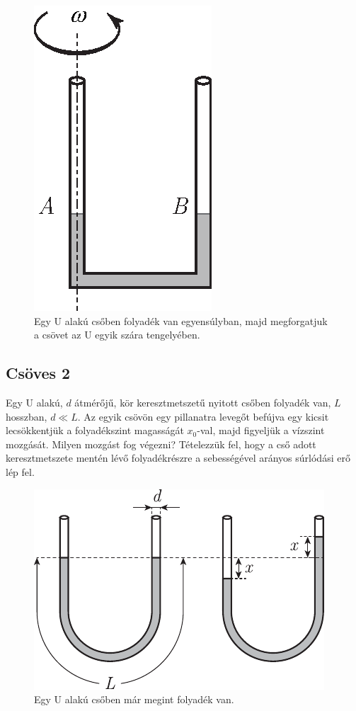 \documentclass[12pt,a4paper]{scrartcl}
\begin{document}
\begin{figure}[htb] 
\centering    
\includegraphics[scale=1]{figs/bernoUlli.eps}
\caption{Egy U alakú csőben folyadék van egyensúlyban, majd megforgatjuk a csövet az U egyik szára tengelyében.}
\label{fig:ucsoves}
\end{figure}
\FloatBarrier

\subsection{Csöves 2}
Egy U alakú, $d$ átmérőjű, kör keresztmetszetű nyitott csőben folyadék van, $L$ hosszban, $d \ll L$. Az egyik csövön egy pillanatra levegőt befújva egy kicsit lecsökkentjük a folyadékszint magasságát $x_0$-val, majd figyeljük a vízszint mozgását. Milyen mozgást fog végezni? Tételezzük fel, hogy a cső adott keresztmetszete mentén lévő folyadékrészre a sebességével arányos súrlódási erő lép fel.
\begin{figure}[htb] 
\centering    
\includegraphics[scale=1]{figs/ucsoves2.pdf}
\caption{Egy U alakú csőben már megint folyadék van.}
\label{fig:ucsoves2}
\end{figure}
\FloatBarrier

\fi
\end{document}
